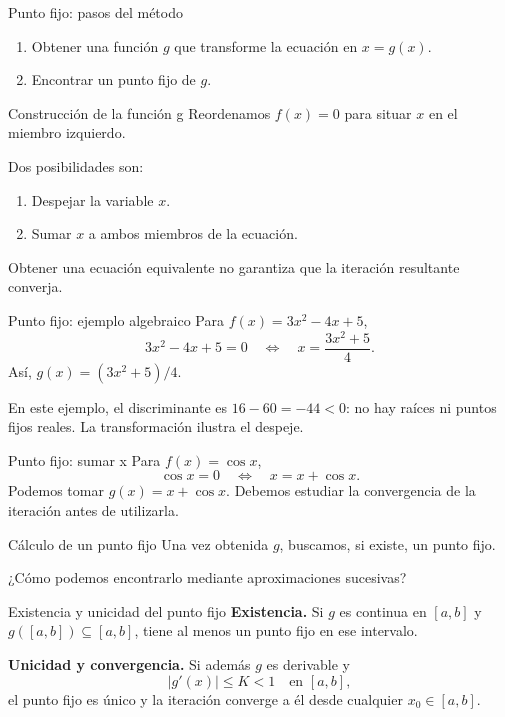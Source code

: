 \documentclass[original_version/main.tex]{subfiles}
\begin{document}
\begin{frame}{Punto fijo: pasos del método}
\begin{enumerate}\item Obtener una función $g$ que transforme la ecuación en $x=g(x)$.\item Encontrar un punto fijo de $g$.\end{enumerate}
\end{frame}

\begin{frame}{Construcción de la función g}
Reordenamos $f(x)=0$ para situar $x$ en el miembro izquierdo.\par\medskip Dos posibilidades son:\begin{enumerate}\item Despejar la variable $x$.\item Sumar $x$ a ambos miembros de la ecuación.\end{enumerate}Obtener una ecuación equivalente no garantiza que la iteración resultante converja.
\end{frame}

\begin{frame}{Punto fijo: ejemplo algebraico}
Para $f(x)=3x^2-4x+5$,\[3x^2-4x+5=0\quad\Longleftrightarrow\quad x=\frac{3x^2+5}{4}.\]Así, $g(x)=(3x^2+5)/4$.\par\medskip En este ejemplo, el discriminante es $16-60=-44<0$: no hay raíces ni puntos fijos reales. La transformación ilustra el despeje.
\end{frame}

\begin{frame}{Punto fijo: sumar x}
Para $f(x)=\cos x$,\[\cos x=0\quad\Longleftrightarrow\quad x=x+\cos x.\]Podemos tomar $g(x)=x+\cos x$. Debemos estudiar la convergencia de la iteración antes de utilizarla.
\end{frame}

\begin{frame}{Cálculo de un punto fijo}
Una vez obtenida $g$, buscamos, si existe, un punto fijo.\par\medskip ¿Cómo podemos encontrarlo mediante aproximaciones sucesivas?
\end{frame}

\begin{frame}{Existencia y unicidad del punto fijo}
\small\textbf{Existencia.} Si $g$ es continua en $[a,b]$ y $g([a,b])\subseteq[a,b]$, tiene al menos un punto fijo en ese intervalo.\par\medskip\textbf{Unicidad y convergencia.} Si además $g$ es derivable y\[|g\prime(x)|\le K<1\quad\text{en }[a,b],\]el punto fijo es único y la iteración converge a él desde cualquier $x_0\in[a,b]$.
\end{frame}
\end{document}
